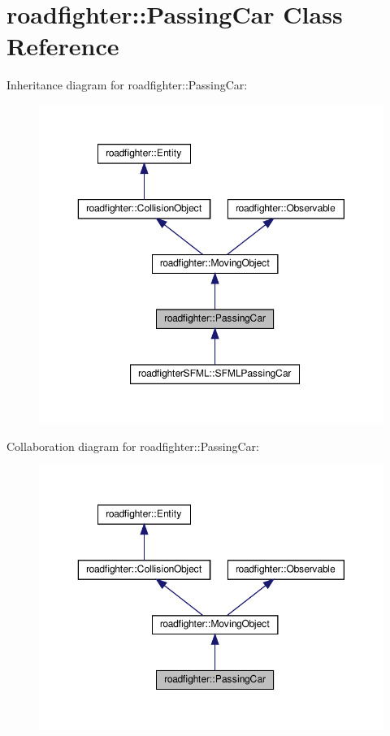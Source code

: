\hypertarget{classroadfighter_1_1PassingCar}{}\section{roadfighter\+:\+:Passing\+Car Class Reference}
\label{classroadfighter_1_1PassingCar}


Inheritance diagram for roadfighter\+:\+:Passing\+Car\+:
\nopagebreak
\begin{figure}[H]
\begin{center}
\leavevmode
\includegraphics[width=350pt]{classroadfighter_1_1PassingCar__inherit__graph}
\end{center}
\end{figure}


Collaboration diagram for roadfighter\+:\+:Passing\+Car\+:
\nopagebreak
\begin{figure}[H]
\begin{center}
\leavevmode
\includegraphics[width=350pt]{classroadfighter_1_1PassingCar__coll__graph}
\end{center}
\end{figure}
